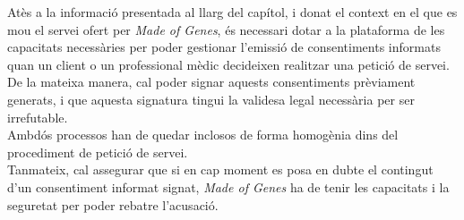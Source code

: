 Atès a la informació presentada al llarg del capítol, i donat el context en el que es mou el servei ofert per \textit{Made of Genes}, és necessari dotar a la plataforma de les capacitats necessàries per poder gestionar l'emissió de consentiments informats quan un client o un professional mèdic decideixen realitzar una petició de servei.\\
\newline De la mateixa manera, cal poder signar aquests consentiments prèviament generats, i que aquesta signatura tingui la validesa legal necessària per ser irrefutable.\\
\newline Ambdós processos han de quedar inclosos de forma homogènia dins del procediment de petició de servei.\\
\newline Tanmateix, cal assegurar que si en cap moment es posa en dubte el contingut d'un consentiment informat signat, \textit{Made of Genes} ha de tenir les capacitats i la seguretat per poder rebatre l'acusació.
